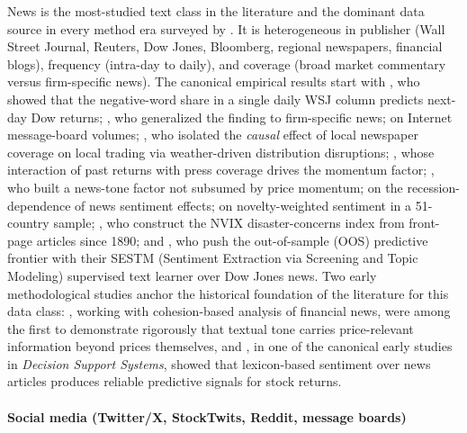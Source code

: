 News is the most-studied text class in the literature and the dominant data source in every method era surveyed by \cite{mishev2020evaluation}. It is heterogeneous in publisher (Wall Street Journal, Reuters, Dow Jones, Bloomberg, regional newspapers, financial blogs), frequency (intra-day to daily), and coverage (broad market commentary versus firm-specific news). The canonical empirical results start with \cite{tetlock2007giving}, who showed that the negative-word share in a single daily WSJ column predicts next-day Dow returns; \cite{tetlock2008more}, who generalized the finding to firm-specific news; \cite{antweiler2004internet} on Internet message-board volumes; \cite{engelberg2011causal}, who isolated the \textit{causal} effect of local newspaper coverage on local trading via weather-driven distribution disruptions; \cite{hillert2014media}, whose interaction of past returns with press coverage drives the momentum factor; \cite{heston2017news}, who built a news-tone factor not subsumed by price momentum; \cite{garcia2013sentiment} on the recession-dependence of news sentiment effects; \cite{calomiris2019news} on novelty-weighted sentiment in a 51-country sample; \cite{manela2017news}, who construct the NVIX disaster-concerns index from front-page articles since 1890; and \cite{ke2019predicting}, who push the out-of-sample (OOS) predictive frontier with their SESTM (Sentiment Extraction via Screening and Topic Modeling) supervised text learner over Dow Jones news. Two early methodological studies anchor the historical foundation of the literature for this data class: \cite{devitt2007sentiment}, working with cohesion-based analysis of financial news, were among the first to demonstrate rigorously that textual tone carries price-relevant information beyond prices themselves, and \cite{schumaker2012evaluating}, in one of the canonical early studies in \textit{Decision Support Systems}, showed that lexicon-based sentiment over news articles produces reliable predictive signals for stock returns.

\paragraph{Social media (Twitter/X, StockTwits, Reddit, message boards)}

